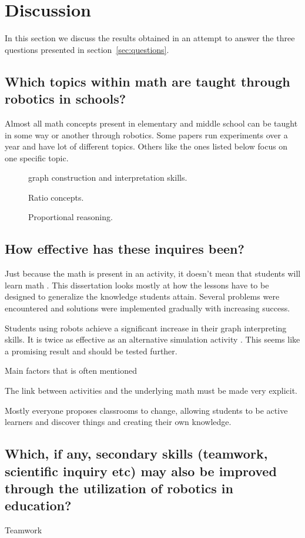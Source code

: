 \section*{Discussion}
In this section we discuss the results obtained in an attempt to answer the three questions presented in section~\ref{sec:questions}.

\subsection*{Which topics within math are taught through robotics in schools?}

Almost all math concepts present in elementary and middle school can be taught in some way or another through robotics. Some papers run experiments over a year and have lot of different topics. Others like the ones listed below focus on one specific topic.

\begin{description}
	\item [] graph construction and interpretation skills.
	\item [] Ratio concepts. 
	\item [] Proportional reasoning.
\end{description}

\subsection*{How effective has these inquires been?}
Just because the math is present in an activity, it doesn't mean that students will learn math . This dissertation looks mostly at how the lessons have to be designed to generalize the knowledge students attain. Several problems were encountered and solutions were implemented gradually with increasing success.

\bigskip\noindent
Students using robots achieve a significant increase in their graph interpreting skills. It is twice as effective as an alternative simulation activity . This seems like a promising result and should be tested further. 

\bigskip\noindent
Main factors that is often mentioned

\bigskip\noindent
The link between activities and the underlying math must be made very explicit. 

\bigskip\noindent
Mostly everyone proposes classrooms to change, allowing students to be active learners and discover things and creating their own knowledge.

\subsection*{Which, if any, secondary skills (teamwork, scientific inquiry etc) may also be improved through the utilization of robotics in education?}

\bigskip\noindent
Teamwork \cite{mitnik2009collaborative, }

